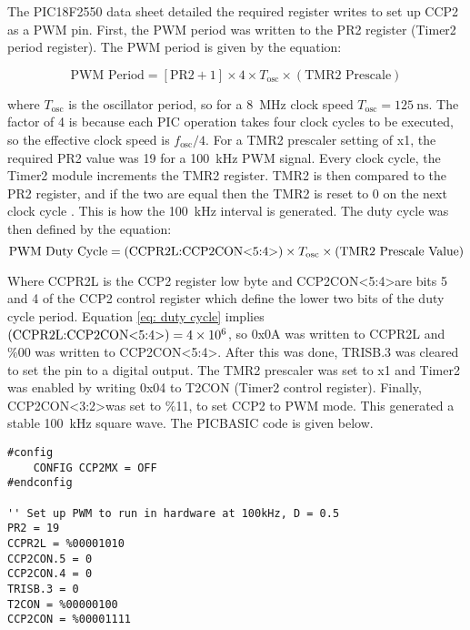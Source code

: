 The PIC18F2550 data sheet \cite{pic18f2550} detailed the required register writes to set up CCP2 as a PWM pin. First, the PWM period was written to the PR2 register (Timer2 period register). The PWM period is given by the equation:

\begin{equation}
\text{PWM Period} = [\text{PR2}+1] \times 4 \times T_\text{osc} \times (\text{TMR2 Prescale})
\end{equation}

where $T_\text{osc}$ is the oscillator period, so for a \SI{8}{\mega\hertz} clock speed $T_\text{osc}=\SI{125}{\nano\second}$. The factor of 4 is because each PIC operation takes four clock cycles to be executed, so the effective clock speed is $f_\text{osc}/4$. For a TMR2 prescaler setting of x1, the required PR2 value was 19 for a \SI{100}{\kilo\hertz} PWM signal. Every clock cycle, the Timer2 module increments the TMR2 register. TMR2 is then compared to the PR2 register, and if the two are equal then the TMR2 is reset to 0 on the next clock cycle \cite{pic18f2550}. This is how the \SI{100}{\kilo\hertz} interval is generated. The duty cycle was then defined by the equation:\\

\begin{equation}
\text{PWM Duty Cycle} = (\text{CCPR2L:CCP2CON\textless5:4\textgreater}) \times T_\text{osc} \times (\text{TMR2 Prescale Value}) \label{eq: duty cycle}
\end{equation}

Where CCPR2L is the CCP2 register low byte and CCP2CON\textless5:4\textgreater are bits 5 and 4 of the CCP2 control register which define the lower two bits of the duty cycle period. Equation \ref{eq: duty cycle} implies $(\text{CCPR2L:CCP2CON\textless5:4\textgreater}) = \num{4e6}$, so 0x0A was written to CCPR2L and \%00 was written to CCP2CON\textless5:4\textgreater. After this was done, TRISB.3 was cleared to set the pin to a digital output. The TMR2 prescaler was set to x1 and Timer2 was enabled by writing 0x04 to T2CON (Timer2 control register). Finally, CCP2CON\textless3:2\textgreater was set to \%11, to set CCP2 to PWM mode. This generated a stable \SI{100}{\kilo\hertz} square wave. The PICBASIC code is given below.\\
\begin{lstlisting}
#config
    CONFIG CCP2MX = OFF
#endconfig

'' Set up PWM to run in hardware at 100kHz, D = 0.5
PR2 = 19
CCPR2L = %00001010
CCP2CON.5 = 0
CCP2CON.4 = 0
TRISB.3 = 0
T2CON = %00000100
CCP2CON = %00001111
\end{lstlisting}




